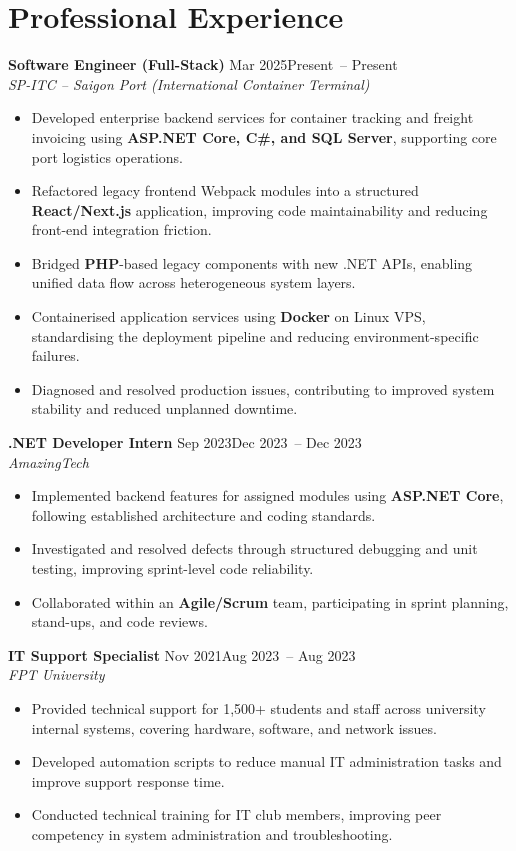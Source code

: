 \documentclass[10.5pt,a4paper]{article}
\newcommand{\jobtitle}[4]{%
  \vspace{2pt}%
  {\bfseries #1} \hfill \textcolor{muted}{\small #3\ifx#4\empty\else\ -- #4\fi}\\%
  \textcolor{muted}{\small\itshape #2}%
  \vspace{2pt}%
}
\begin{document}
\section{Professional Experience}

\jobtitle{Software Engineer (Full-Stack)}{SP-ITC -- Saigon Port (International Container Terminal)}{Mar 2025}{Present}
\begin{itemize}
  \item Developed enterprise backend services for container tracking and freight invoicing using \textbf{ASP.NET Core, C\#, and SQL Server}, supporting core port logistics operations.
  \item Refactored legacy frontend Webpack modules into a structured \textbf{React/Next.js} application, improving code maintainability and reducing front-end integration friction.
  \item Bridged \textbf{PHP}-based legacy components with new .NET APIs, enabling unified data flow across heterogeneous system layers.
  \item Containerised application services using \textbf{Docker} on Linux VPS, standardising the deployment pipeline and reducing environment-specific failures.
  \item Diagnosed and resolved production issues, contributing to improved system stability and reduced unplanned downtime.
\end{itemize}

\jobtitle{.NET Developer Intern}{AmazingTech}{Sep 2023}{Dec 2023}
\begin{itemize}
  \item Implemented backend features for assigned modules using \textbf{ASP.NET Core}, following established architecture and coding standards.
  \item Investigated and resolved defects through structured debugging and unit testing, improving sprint-level code reliability.
  \item Collaborated within an \textbf{Agile/Scrum} team, participating in sprint planning, stand-ups, and code reviews.
\end{itemize}

\jobtitle{IT Support Specialist}{FPT University}{Nov 2021}{Aug 2023}
\begin{itemize}
  \item Provided technical support for 1,500+ students and staff across university internal systems, covering hardware, software, and network issues.
  \item Developed automation scripts to reduce manual IT administration tasks and improve support response time.
  \item Conducted technical training for IT club members, improving peer competency in system administration and troubleshooting.
\end{itemize}
\end{document}
